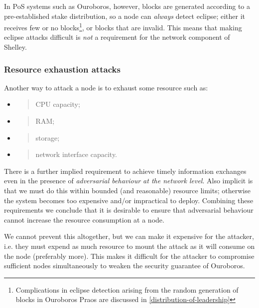 \documentclass[11pt,a4paper]{article}
\begin{document}
In PoS systems such as Ouroboros, however, blocks are generated
according to a pre-established stake distribution, so a node can
\emph{always} detect eclipse; either it receives few or no
blocks\footnote{Complications in eclipse detection arising from the
  random generation of blocks in Ouroboros Praos are discussed in
  \cref{distribution-of-leadership}}, or
blocks that are invalid. This means that making eclipse attacks
difficult is \emph{not} a requirement for the network component of
Shelley.

\subsubsection{Resource exhaustion attacks}
\label{resource-exhaustion-attacks}

Another way to attack a node is to exhaust some resource such as:

\begin{itemize}
\item
  \begin{quote}
  CPU capacity;
  \end{quote}
\item
  \begin{quote}
  RAM;
  \end{quote}
\item
  \begin{quote}
  storage;
  \end{quote}
\item
  \begin{quote}
  network interface capacity.
  \end{quote}
\end{itemize}

There is a further implied requirement to achieve timely information
exchanges even in the presence of \emph{adversarial behaviour at the
network level}. Also implicit is that we must do this within bounded
(and reasonable) resource limits; otherwise the system becomes too
expensive and/or impractical to deploy. Combining these requirements we
conclude that it is desirable to ensure that adversarial behaviour
cannot increase the resource consumption at a node.

We cannot prevent this altogether, but we can make it expensive for the
attacker, i.e. they must expend as much resource to mount the attack as
it will consume on the node (preferably more). This makes it difficult
for the attacker to compromise sufficient nodes simultaneously to weaken
the security guarantee of Ouroboros.
\end{document}
